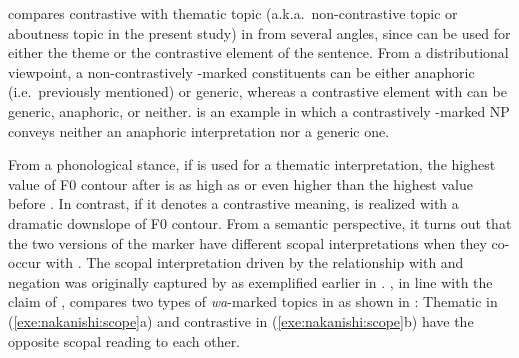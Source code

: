 \citet{nakanishi:07} compares contrastive  with thematic topic
(a.k.a.\ non-contrastive topic or aboutness topic in the present
study) in  from several angles, since \wa can be used
for either the theme or the contrastive element of the sentence. From
a distributional viewpoint, a non-contrastively \wa-marked
constituents can be either anaphoric (i.e.\ previously mentioned) or
generic, whereas a contrastive element with \wa can be generic,
anaphoric, or neither.  is an example in
which a contrastively \wa-marked NP conveys neither an anaphoric
interpretation nor a generic one.




\noindent From a phonological stance, if \wa is used for a thematic
interpretation, the highest value of F0 contour after \wa is as high
as or even higher than the highest value before \wa.
In contrast, if it denotes a contrastive meaning,
\wa is realized with a dramatic
downslope of F0 contour.  From a semantic perspective, it turns out
that the two versions of the marker have different scopal
interpretations when they co-occur with . The scopal
interpretation driven by the relationship with  and negation was
originally captured by \citet{buring:97} as exemplified earlier in
. \citeauthor{nakanishi:07}, in line with the
claim of \citeauthor{buring:97}, compares two types of
\textit{wa}-marked topics in  as shown in
: Thematic \wa in
(\ref{exe:nakanishi:scope}a) and contrastive \wa in
(\ref{exe:nakanishi:scope}b) have the opposite scopal reading to each
other.





